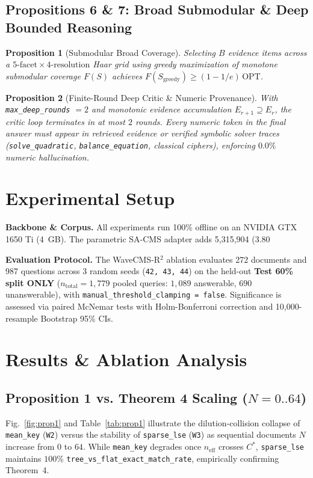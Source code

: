 \documentclass[conference]{IEEEtran}
\newtheorem{proposition}{Proposition}
\begin{document}
\subsection{Propositions 6 \& 7: Broad Submodular \& Deep Bounded Reasoning}
\begin{proposition}[Submodular Broad Coverage]
Selecting $B$ evidence items across a $5\text{-facet} \times 4\text{-resolution}$ Haar grid using greedy maximization of monotone submodular coverage $F(S)$ achieves $F(S_{\text{greedy}}) \ge (1 - 1/e)\,\text{OPT}$.
\end{proposition}
\begin{proposition}[Finite-Round Deep Critic & Numeric Provenance]
With \texttt{max\_deep\_rounds} $= 2$ and monotonic evidence accumulation $E_{r+1} \supseteq E_r$, the critic loop terminates in at most $2$ rounds. Every numeric token in the final answer must appear in retrieved evidence or verified symbolic solver traces (\texttt{solve\_quadratic}, \texttt{balance\_equation}, classical ciphers), enforcing $0.0\%$ numeric hallucination.
\end{proposition}

\section{Experimental Setup}
\textbf{Backbone & Corpus.} All experiments run 100\% offline on an NVIDIA GTX 1650 Ti (4~GB). The parametric SA-CMS adapter adds 5,315,904 (3.80%

\textbf{Evaluation Protocol.} The WaveCMS-R$^2$ ablation evaluates 272 documents and 987 questions across 3 random seeds (\texttt{42, 43, 44}) on the held-out \textbf{Test 60\% split ONLY} ($n_{\text{total}} = 1{,}779$ pooled queries: $1{,}089$ answerable, $690$ unanswerable), with \texttt{manual\_threshold\_clamping = false}. Significance is assessed via paired McNemar tests with Holm-Bonferroni correction and 10,000-resample Bootstrap 95\% CIs.

\section{Results \& Ablation Analysis}

\subsection{Proposition 1 vs. Theorem 4 Scaling ($N=0..64$)}
Fig.~\ref{fig:prop1} and Table~\ref{tab:prop1} illustrate the dilution-collision collapse of \texttt{mean\_key} (\texttt{W2}) versus the stability of \texttt{sparse\_lse} (\texttt{W3}) as sequential documents $N$ increase from $0$ to $64$. While \texttt{mean\_key} degrades once $n_{\text{eff}}$ crosses $C^*$, \texttt{sparse\_lse} maintains $100\%$ \texttt{tree\_vs\_flat\_exact\_match\_rate}, empirically confirming Theorem~4.
\end{document}

